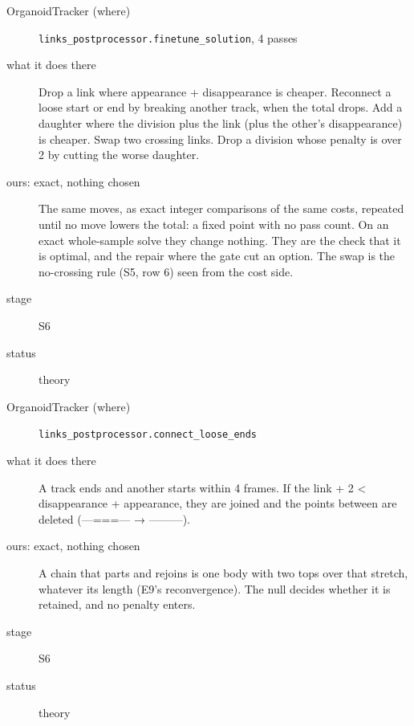 \begin{description}
\item[{OrganoidTracker (where)}] \texttt{links\_\allowbreak{}postprocessor.\allowbreak{}finetune\_\allowbreak{}solution}, 4 passes
\item[{what it does there}] Drop a link where appearance + disappearance is cheaper. Reconnect a loose start or end by breaking another track, when the total drops. Add a daughter where the division plus the link (plus the other's disappearance) is cheaper. Swap two crossing links. Drop a division whose penalty is over 2 by cutting the worse daughter.
\item[{ours: exact, nothing chosen}] The same moves, as exact integer comparisons of the same costs, repeated until no move lowers the total: a fixed point with no pass count. On an exact whole-sample solve they change nothing. They are the check that it is optimal, and the repair where the gate cut an option. The swap is the no-crossing rule (S5, row 6) seen from the cost side.
\item[{stage}] S6
\item[{status}] theory
\end{description}

\begin{description}
\item[{OrganoidTracker (where)}] \texttt{links\_\allowbreak{}postprocessor.\allowbreak{}connect\_\allowbreak{}loose\_\allowbreak{}ends}
\item[{what it does there}] A track ends and another starts within 4 frames. If the link + 2 < disappearance + appearance, they are joined and the points between are deleted (---===--- → ---------).
\item[{ours: exact, nothing chosen}] A chain that parts and rejoins is one body with two tops over that stretch, whatever its length (E9's reconvergence). The null decides whether it is retained, and no penalty enters.
\item[{stage}] S6
\item[{status}] theory
\end{description}

